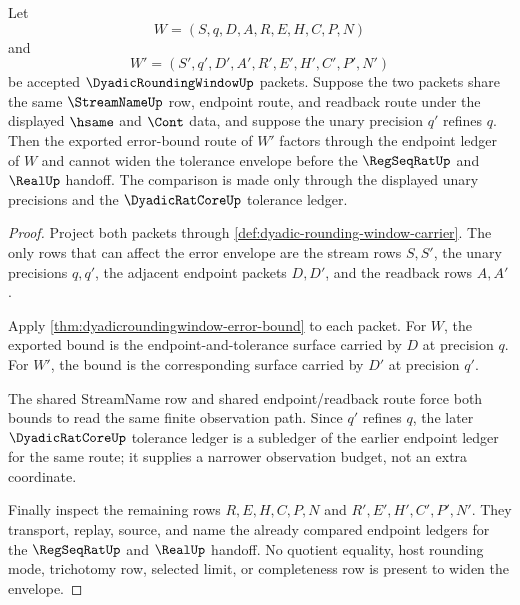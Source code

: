 \begin{theorem}
\label{thm:dyadicroundingwindow-error-envelope-monotonicity}
Let
$$
W=(S,q,D,A,R,E,H,C,P,N)
$$
and
$$
W'=(S',q',D',A',R',E',H',C',P',N')
$$
be accepted $\DyadicRoundingWindowUp$ packets. Suppose the two packets share the same $\StreamNameUp$ row, endpoint route, and readback route under the displayed $\hsame$ and $\Cont$ data, and suppose the unary precision $q'$ refines $q$. Then the exported error-bound route of $W'$ factors through the endpoint ledger of $W$ and cannot widen the tolerance envelope before the $\RegSeqRatUp$ and $\RealUp$ handoff. The comparison is made only through the displayed unary precisions and the $\DyadicRatCoreUp$ tolerance ledger.
\end{theorem}
\begin{proof}
Project both packets through \autoref{def:dyadic-rounding-window-carrier}. The only rows that can affect the error envelope are the stream rows $S,S'$, the unary precisions $q,q'$, the adjacent endpoint packets $D,D'$, and the readback rows $A,A'$.

Apply \autoref{thm:dyadicroundingwindow-error-bound} to each packet. For $W$, the exported bound is the endpoint-and-tolerance surface carried by $D$ at precision $q$. For $W'$, the bound is the corresponding surface carried by $D'$ at precision $q'$.

The shared StreamName row and shared endpoint/readback route force both bounds to read the same finite observation path. Since $q'$ refines $q$, the later $\DyadicRatCoreUp$ tolerance ledger is a subledger of the earlier endpoint ledger for the same route; it supplies a narrower observation budget, not an extra coordinate.

Finally inspect the remaining rows $R,E,H,C,P,N$ and $R',E',H',C',P',N'$. They transport, replay, source, and name the already compared endpoint ledgers for the $\RegSeqRatUp$ and $\RealUp$ handoff. No quotient equality, host rounding mode, trichotomy row, selected limit, or completeness row is present to widen the envelope.
\end{proof}

